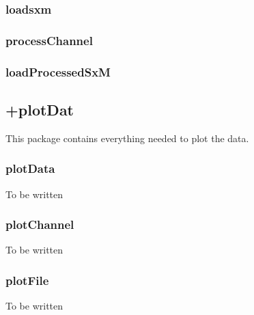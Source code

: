 \subsubsection{loadsxm}

\subsubsection{processChannel}

\subsubsection{loadProcessedSxM}

\subsection{+plotDat}
This package contains everything needed to plot the data.
\subsubsection{plotData}
To be written
%
%
\subsubsection{plotChannel}
To be written
%
%
\subsubsection{plotFile}
To be written
%



